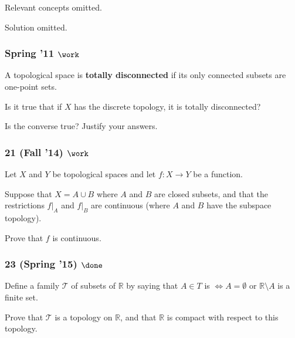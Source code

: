 Relevant concepts omitted.

Solution omitted.

\hypertarget{spring-11-work}{%
\subsubsection{\texorpdfstring{Spring '11
\(\work\)}{Spring '11 \textbackslash work}}\label{spring-11-work}}

\begin{problem}[?]

A topological space is \textbf{totally disconnected} if its only
connected subsets are one-point sets.

Is it true that if \(X\) has the discrete topology, it is totally
disconnected?

Is the converse true? Justify your answers.

\end{problem}

\hypertarget{fall-14-work}{%
\subsubsection{\texorpdfstring{21 (Fall '14)
\(\work\)}{21 (Fall '14) \textbackslash work}}\label{fall-14-work}}

\begin{problem}[?]

Let \(X\) and \(Y\) be topological spaces and let \(f : X \to Y\) be a
function.

Suppose that \(X = A \cup B\) where \(A\) and \(B\) are closed subsets,
and that the restrictions \(f \mathrel{\Big|}_A\) and
\(f \mathrel{\Big|}_B\) are continuous (where \(A\) and \(B\) have the
subspace topology).

Prove that \(f\) is continuous.

\end{problem}

\hypertarget{spring-15-done}{%
\subsubsection{\texorpdfstring{23 (Spring '15)
\(\done\)}{23 (Spring '15) \textbackslash done}}\label{spring-15-done}}

\begin{problem}[?]

Define a family \({\mathcal{T}}\) of subsets of \({\mathbb{R}}\) by
saying that \(A \in T\) is \(\iff A = \emptyset\) or
\({\mathbb{R}}\setminus A\) is a finite set.

Prove that \({\mathcal{T}}\) is a topology on \({\mathbb{R}}\), and that
\({\mathbb{R}}\) is compact with respect to this topology.

\end{problem}

